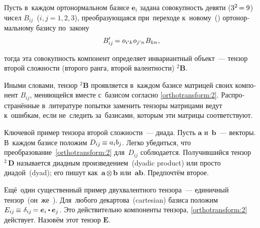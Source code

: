 \begin{otherlanguage}{russian}

Пусть в~каждом ортонормальном базисе ${\bm{e}_i}$ задана совокупность девяти (${3^2 \hspace{-0.24ex}=\hspace{-0.12ex} 9}$) чисел ${B_{ij}}$~(${i, j = 1, 2, 3}$), преобразующаяся при~переходе к~новому~() ортонормальному базису по~закону
\vspace{-1em}\begin{equation}\label{orthotransform:2}
B'_{ij} \hspace{-0.16ex} = o_{i'k} \hspace{.1ex} o_{j'n} \hspace{.16ex} B_{kn} \hspace{0.1ex},
\end{equation}

\vspace{-0.5em} \noindent тогда эта совокупность компонент определяет инвариантный объект~--- тензор второй сложности (второго ранга, второй валентности) ${^2\!\bm{B}}$.


Иными словами, тензор ${^2\!\bm{B}}$ проявляется в~каждом базисе матрицей своих компонент ${B_{ij}}$, меняющейся вместе с~базисом согласно \eqref{orthotransform:2}. Распространённые в~литературе попытки заменить тензоры матрицами ведут к~ошибкам, если не~следить за~базисами, которым эти матрицы соответствуют.

Ключевой пример тензора второй сложности~--- диада. Пусть ${\bm{a}}$ и~${\bm{b}}$~--- векторы. В~каждом базисе положим ${D_{ij} \hspace{-0.2ex} \equiv a_i b_j}$. Легко убедиться, что преобразование~\eqref{orthotransform:2} для~${D_{ij}}$ соблюдается. Получившийся тензор ${^2\!\!\,\bm{D}}$ называется диадным произведением~(dyadic product) или просто диадой~(dyad); его пишут как~${\bm{a} \otimes \bm{b}}$ или~${\bm{a} \bm{b}}$. Предпочтём второе.

Ещё~один существенный пример двухвалентного тензора~--- единичный тензор~(он~же~). Для~любого декартова~(cartesian) базиса положим ${E_{ij} \hspace{-0.2ex} \equiv \hspace{0.12ex} \delta_{ij} \hspace{-0.2ex} = \bm{e}_i \dotp \bm{e}_j}$. Это действительно компоненты тензора, \eqref{orthotransform:2} действует. Назовём этот тензор ${\bm{E}}$.


\end{otherlanguage}
